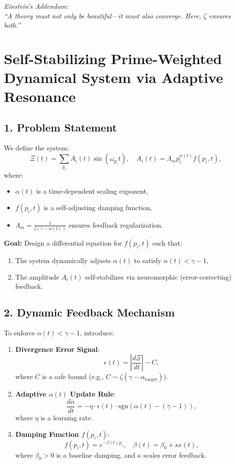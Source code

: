 \documentclass[12pt]{article}
\theoremstyle{plain}
\begin{document}
\vspace{0.5em}
\textit{Einstein’s Addendum}: \\
\emph{``A theory must not only be beautiful—it must also converge. Here, \( \zeta \) ensures both.''}

\section{Self-Stabilizing Prime-Weighted Dynamical System via Adaptive Resonance}

\subsection*{1. Problem Statement}

We define the system:
\[
\Xi(t) = \sum_{p_i} A_i(t) \sin(\omega_{p_i} t), \quad A_i(t) = \Lambda_m p_i^{\alpha(t)} f(p_i, t),
\]
where:
\begin{itemize}
    \item \( \alpha(t) \) is a time-dependent scaling exponent,
    \item \( f(p_i, t) \) is a self-adjusting damping function,
    \item \( \Lambda_m = \frac{1}{\zeta(\gamma - \alpha(t))} \) ensures feedback regularization.
\end{itemize}

\textbf{Goal:} Design a differential equation for \( f(p_i, t) \) such that:
\begin{enumerate}
    \item The system dynamically adjusts \( \alpha(t) \) to satisfy \( \alpha(t) < \gamma - 1 \),
    \item The amplitude \( A_i(t) \) self-stabilizes via neuromorphic (error-correcting) feedback.
\end{enumerate}

\subsection*{2. Dynamic Feedback Mechanism}

To enforce \( \alpha(t) < \gamma - 1 \), introduce:

\begin{enumerate}
    \item \textbf{Divergence Error Signal}:
    \[
    \epsilon(t) = \left| \frac{d\Xi}{dt} \right| - C,
    \]
    where \( C \) is a safe bound (e.g., \( C \sim \zeta(\gamma - \alpha_{\text{target}}) \)).

    \item \textbf{Adaptive \( \alpha(t) \) Update Rule}:
    \[
    \frac{d\alpha}{dt} = -\eta \cdot \epsilon(t) \cdot \text{sgn}(\alpha(t) - (\gamma - 1)),
    \]
    where \( \eta \) is a learning rate.

    \item \textbf{Damping Function \( f(p_i, t) \)}:
    \[
    f(p_i, t) = e^{-\beta(t) p_i}, \quad \beta(t) = \beta_0 + \kappa \epsilon(t),
    \]
    where \( \beta_0 > 0 \) is a baseline damping, and \( \kappa \) scales error feedback.
\end{enumerate}
\end{document}
